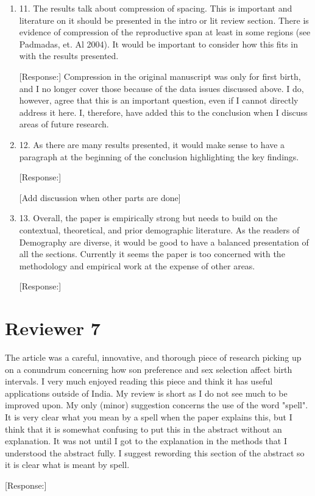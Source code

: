 \documentclass[letterpaper,12pt]{article}
\begin{document}
\begin{enumerate}
[Response:]

As detailed above, I have refocused the Results section to focus mainly on birth spacing
and how that is affected by the increased use of sex selection over time.
I now instead refer to the previous literature on sex ratios and use that as a guide for
structuring the analysis of birth spacing.


\item 11. The results talk about compression of spacing. This is important and
literature on it should be presented in the intro or lit review section.
There is evidence of compression of the reproductive span at least in
some regions (see Padmadas, et. Al 2004). It would be important to
consider how this fits in with the results presented.

[Response:]
Compression in the original manuscript was only for first birth, and I no longer cover 
those because of the data issues discussed above.
I do, however, agree that this is an important question, even if I cannot directly
address it here.
I, therefore, have added this to the conclusion when I discuss areas of future research.


\item 12. As there are many results presented, it would make sense to have a
paragraph at the beginning of the conclusion highlighting the key
findings.

[Response:]

[Add discussion when other parts are done]

\item 13. Overall, the paper is empirically strong but needs to build on the
contextual, theoretical, and prior demographic literature. As the
readers of Demography are diverse, it would be good to have a balanced
presentation of all the sections. Currently it seems the paper is too
concerned with the methodology and empirical work at the expense of
other areas.

[Response:]



\end{enumerate}

\newpage

\section*{Reviewer 7}

The article was a careful, innovative, and thorough piece of research
picking up on a conundrum concerning how son preference and sex
selection affect birth intervals. I very much enjoyed reading this piece
and think it has useful applications outside of India.  My review is
short as I do not see much to be improved upon.  My only (minor)
suggestion concerns the use of the word "spell".  It is very clear what
you mean by a spell when the paper explains this, but I think that it is
somewhat confusing to put this in the abstract without an explanation. 
It was not until I got to the explanation in the methods that I
understood the abstract fully.  I suggest rewording this section of the
abstract so it is clear what is meant by spell.

[Response:]



\newpage


\end{document}
